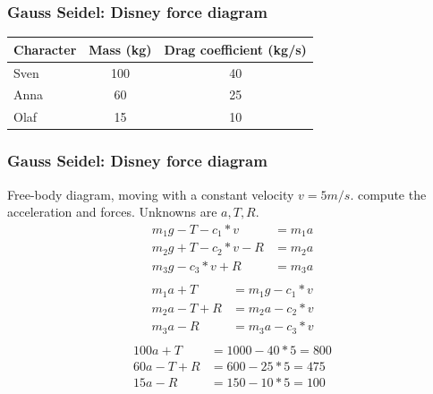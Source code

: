 \documentclass[notes]{beamer}
\begin{document}
\begin{frame}
	\frametitle{Gauss Seidel: Disney force diagram}
	\begin{table}[]
		\begin{tabular}{lcc}
			\toprule
			\textbf{Character} & \textbf{Mass (kg)} & \textbf{Drag coefficient (kg/s)} \\
			\midrule
			Sven               & 100                & 40                               \\
			Anna               & 60                 & 25                                \\
			Olaf               & 15                 & 10                               \\
			\bottomrule
		\end{tabular}
	\end{table}
\end{frame}

\begin{frame}
	\frametitle{Gauss Seidel: Disney force diagram}
	Free-body diagram, moving with a constant velocity $v = 5 m/s$. compute the acceleration and forces. Unknowns are $a, T, R$.
	\begin{align*}
		m_1 g - T - c_1 * v & = m_1 a \\
		m_2 g + T - c_2 * v - R &= m_2 a \\
		m_3 g     - c_3 * v + R & = m_3 a \\
	\end{align*}
	\begin{align*}
	m_1 a + T & = m_1 g - c_1 * v \\
	m_2 a - T + R &= m_2 a - c_2 * v \\
	m_3 a     - R & = m_3 a - c_3 * v \\
	\end{align*}
	\begin{align*}
		100 a + T & = 1000 - 40 * 5 = 800\\
		60 a - T + R &= 600 - 25 * 5  = 475\\
		15 a     - R & = 150 - 10 * 5 = 100 \\
	\end{align*}
\end{frame}
\end{document}
